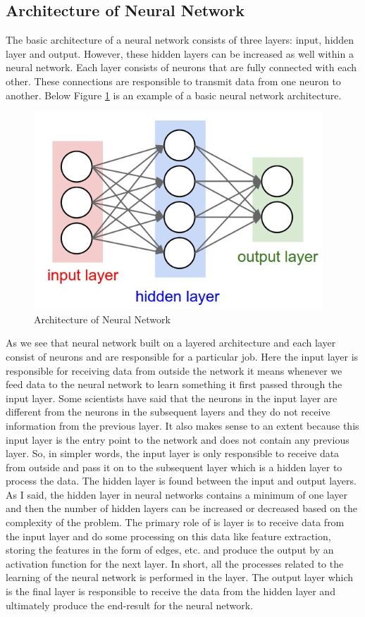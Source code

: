 \subsection{Architecture of Neural Network}
The basic architecture of a neural network consists of three layers: input, hidden layer and output. However, these hidden layers can be increased as well within a neural network. Each layer consists of neurons that are fully connected with each other. These connections are responsible to transmit data from one neuron to another. Below Figure \ref{ann-archi} is an example of a basic neural network architecture.
\begin{figure}[H]
\centering
\includegraphics[scale=0.7]{images/Chapter2/ann-arch.PNG}
\caption{Architecture of Neural Network \cite{ann_arch}}
\label{ann-archi}
\end{figure}
\par
As we see that neural network built on a layered architecture and each layer consist of neurons and are responsible for a particular job. Here the input layer is responsible for receiving data from outside the network it means whenever we feed data to the neural network to learn something it first passed through the input layer. Some scientists have said that the neurons in the input layer are different from the neurons in the subsequent layers and they do not receive information from the previous layer. It also makes sense to an extent because this input layer is the entry point to the network and does not contain any previous layer. So, in simpler words, the input layer is only responsible to receive data from outside and pass it on to the subsequent layer which is a hidden layer to process the data. The hidden layer is found between the input and output layers. As I said, the hidden layer in neural networks contains a minimum of one layer and then the number of hidden layers can be increased or decreased based on the complexity of the problem. The primary role of is layer is to receive data from the input layer and do some processing on this data like feature extraction, storing the features in the form of edges, etc. and produce the output by an activation function for the next layer. In short, all the processes related to the learning of the neural network is performed in the layer. The output layer which is the final layer is responsible to receive the data from the hidden layer and ultimately produce the end-result for the neural network.
